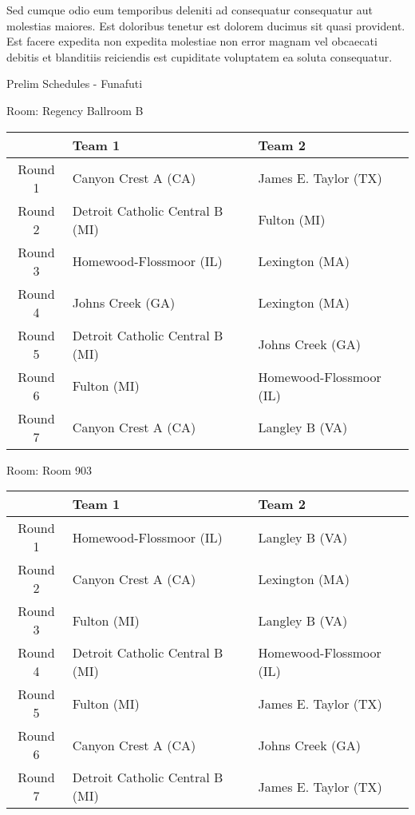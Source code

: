 \documentclass{article}%
\begin{document}
\newline%
Sed cumque odio eum temporibus deleniti ad consequatur consequatur aut molestias maiores. Est doloribus tenetur est dolorem ducimus sit quasi provident. Est facere expedita non expedita molestiae non error magnam vel obcaecati debitis et blanditiis reiciendis est cupiditate voluptatem ea soluta consequatur.%
\newpage%
\begin{center}%
\begin{Huge}%
Prelim Schedules {-} Funafuti%
\end{Huge}%
\end{center}%
\begin{flushleft}%
\begin{Large}%
Room: Regency Ballroom B%
\end{Large}%
\end{flushleft}%
\begin{tabularx}{\textwidth}{|c|Y|Y|}%
\hline%
&Team 1&Team 2\\%
\hline%
Round 1&Canyon Crest A (CA)&James E. Taylor (TX)\\%
Round 2&Detroit Catholic Central B (MI)&Fulton (MI)\\%
Round 3&Homewood{-}Flossmoor (IL)&Lexington (MA)\\%
Round 4&Johns Creek (GA)&Lexington (MA)\\%
Round 5&Detroit Catholic Central B (MI)&Johns Creek (GA)\\%
Round 6&Fulton (MI)&Homewood{-}Flossmoor (IL)\\%
Round 7&Canyon Crest A (CA)&Langley B (VA)\\%
\hline%
\end{tabularx}%
\vspace*{8pt}%
\linebreak%
\begin{flushleft}%
\begin{Large}%
Room: Room 903%
\end{Large}%
\end{flushleft}%
\begin{tabularx}{\textwidth}{|c|Y|Y|}%
\hline%
&Team 1&Team 2\\%
\hline%
Round 1&Homewood{-}Flossmoor (IL)&Langley B (VA)\\%
Round 2&Canyon Crest A (CA)&Lexington (MA)\\%
Round 3&Fulton (MI)&Langley B (VA)\\%
Round 4&Detroit Catholic Central B (MI)&Homewood{-}Flossmoor (IL)\\%
Round 5&Fulton (MI)&James E. Taylor (TX)\\%
Round 6&Canyon Crest A (CA)&Johns Creek (GA)\\%
Round 7&Detroit Catholic Central B (MI)&James E. Taylor (TX)\\%
\hline%
\end{tabularx}%
\end{document}
